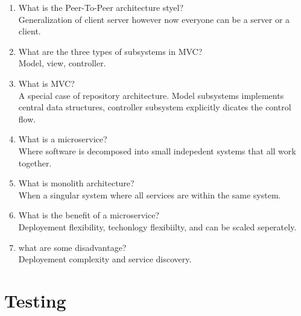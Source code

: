 \documentclass[10pt]{article}
\begin{document}
\begin{enumerate}
      \item What is the Peer-To-Peer architecture styel?\\
            Generalization of client server however now everyone can be a server or a client.\\


      \item What are the three types of subsystems in MVC?\\
            Model, view, controller.\\

      \item What is MVC?\\
            A special case of repository architecture. Model subsystems implements central data structures, controller subsystem explicitly dicates the control flow.\\

      \item What is a microservice?\\
            Where software is decomposed into small indepedent systems that all work together.\\

      \item What is monolith architecture?\\
            When a singular system where all services are within the same system.\\

      \item What is the benefit of a microservice?\\
            Deployement flexibility, techonlogy flexibiilty, and can be scaled seperately.\\

      \item what are some disadvantage?\\
            Deployement complexity and service discovery.\\




\end{enumerate}

\section{Testing}
\end{document}
